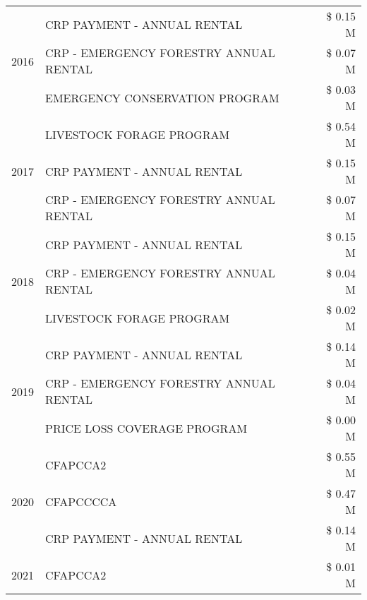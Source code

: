 \begin{tabular}{llr}
\multirow[t]{3}{*}{2016} & CRP PAYMENT - ANNUAL RENTAL & \$ 0.15 M \\
 & CRP - EMERGENCY FORESTRY ANNUAL RENTAL & \$ 0.07 M \\
 & EMERGENCY CONSERVATION PROGRAM & \$ 0.03 M \\
\cline{1-3}
\multirow[t]{3}{*}{2017} & LIVESTOCK FORAGE PROGRAM & \$ 0.54 M \\
 & CRP PAYMENT - ANNUAL RENTAL & \$ 0.15 M \\
 & CRP - EMERGENCY FORESTRY ANNUAL RENTAL & \$ 0.07 M \\
\cline{1-3}
\multirow[t]{3}{*}{2018} & CRP PAYMENT - ANNUAL RENTAL & \$ 0.15 M \\
 & CRP - EMERGENCY FORESTRY ANNUAL RENTAL & \$ 0.04 M \\
 & LIVESTOCK FORAGE PROGRAM & \$ 0.02 M \\
\cline{1-3}
\multirow[t]{3}{*}{2019} & CRP PAYMENT - ANNUAL RENTAL & \$ 0.14 M \\
 & CRP - EMERGENCY FORESTRY ANNUAL RENTAL & \$ 0.04 M \\
 & PRICE LOSS COVERAGE PROGRAM & \$ 0.00 M \\
\cline{1-3}
\multirow[t]{3}{*}{2020} & CFAPCCA2 & \$ 0.55 M \\
 & CFAPCCCCA & \$ 0.47 M \\
 & CRP PAYMENT - ANNUAL RENTAL & \$ 0.14 M \\
\cline{1-3}
2021 & CFAPCCA2 & \$ 0.01 M \\
\cline{1-3}
\bottomrule
\end{tabular}
